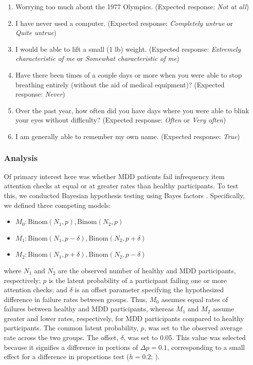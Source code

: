 \documentclass[a4paper,notitlepage,12pt]{article}
\begin{document}
\begin{enumerate}
    \item Worrying too much about the 1977 Olympics. (Expected response: \textit{Not at all})
    \item I have never used a computer. (Expected response: \textit{Completely untrue} or \textit{Quite untrue})
    \item I would be able to lift a small (1 lb) weight. (Expected response: \textit{Extremely characteristic of me} or \textit{Somewhat characteristic of me})
    \item Have there been times of a couple days or more when you were able to stop breathing entirely (without the aid of medical equipment)? (Expected response: \textit{Never})
    \item Over the past year, how often did you have days where you were able to blink your eyes without difficulty? (Expected response: \textit{Often} or \textit{Very often})
    \item I am generally able to remember my own name. (Expected response: \textit{True})
\end{enumerate}

\subsubsection*{Analysis}

Of primary interest here was whether MDD patients fail infrequency item attention checks at equal or at greater rates than healthy participants. To test this, we conducted Bayesian hypothesis testing using Bayes factors \cite{harms2018making}. Specifically, we defined three competing models:

\begin{itemize}
    \item $M_0: \text{Binom}(N_1, p), \text{Binom}(N_2, p)$  
    \item $M_1: \text{Binom}(N_1, p - \delta), \text{Binom}(N_2, p + \delta)$  
    \item $M_2: \text{Binom}(N_1, p + \delta), \text{Binom}(N_2, p - \delta)$  
\end{itemize}

where $N_1$ and $N_2$ are the observed number of healthy and MDD participants, respectively; $p$ is the latent probability of a participant failing one or more attention checks; and $\delta$ is an offset parameter specifying the hypothesized difference in failure rates between groups. Thus, $M_0$ assumes equal rates of failures between healthy and MDD participants, whereas $M_1$ and $M_2$ assume greater and lower rates, respectively, for MDD participants compared to healthy participants. The common latent probability, $p$, was set to the observed average rate across the two groups. The offset, $\delta$, was set to 0.05. This value was selected because it signifies a difference in portions of $\Delta p = 0.1$, corresponding to a small effect for a difference in proportions test ($h = 0.2$; \cite{cohen2013statistical}). 
\end{document}
